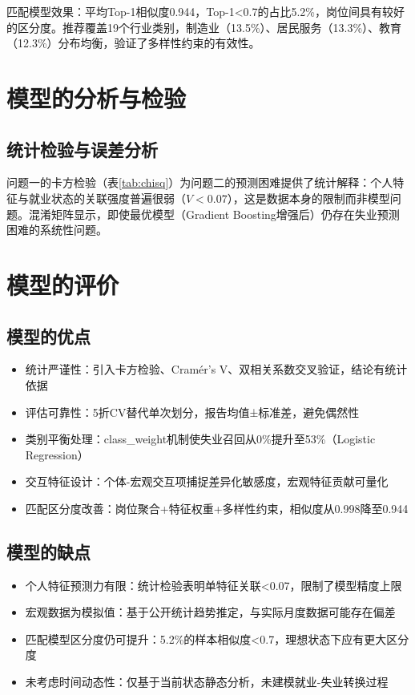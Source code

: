 \documentclass[withoutpreface,bwprint]{cumcmthesis}
\begin{document}
匹配模型效果：平均Top-1相似度0.944，Top-1<0.7的占比5.2\%，岗位间具有较好的区分度。推荐覆盖19个行业类别，制造业（13.5\%）、居民服务（13.3\%）、教育（12.3\%）分布均衡，验证了多样性约束的有效性。

\section{模型的分析与检验}

\subsection{统计检验与误差分析}

问题一的卡方检验（表\ref{tab:chisq}）为问题二的预测困难提供了统计解释：个人特征与就业状态的关联强度普遍很弱（$V<0.07$），这是数据本身的限制而非模型问题。混淆矩阵显示，即使最优模型（Gradient Boosting增强后）仍存在失业预测困难的系统性问题。


\section{模型的评价}

\subsection{模型的优点}
\begin{itemize}[itemindent=2em]
\item 统计严谨性：引入卡方检验、Cramér's V、双相关系数交叉验证，结论有统计依据
\item 评估可靠性：5折CV替代单次划分，报告均值±标准差，避免偶然性
\item 类别平衡处理：class\_weight机制使失业召回从0\%提升至53\%（Logistic Regression）
\item 交互特征设计：个体-宏观交互项捕捉差异化敏感度，宏观特征贡献可量化
\item 匹配区分度改善：岗位聚合+特征权重+多样性约束，相似度从0.998降至0.944
\end{itemize}

\subsection{模型的缺点}
\begin{itemize}[itemindent=2em]
\item 个人特征预测力有限：统计检验表明单特征关联<0.07，限制了模型精度上限
\item 宏观数据为模拟值：基于公开统计趋势推定，与实际月度数据可能存在偏差
\item 匹配模型区分度仍可提升：5.2\%的样本相似度<0.7，理想状态下应有更大区分度
\item 未考虑时间动态性：仅基于当前状态静态分析，未建模就业-失业转换过程
\end{itemize}
\end{document}
